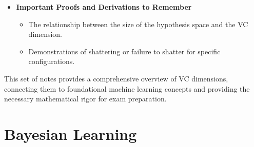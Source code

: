 \documentclass[
  12pt,
]{report}
\providecommand{\tightlist}{%
  \setlength{\itemsep}{0pt}\setlength{\parskip}{0pt}}
\begin{document}
\begin{enumerate}
\begin{itemize}
    \begin{itemize}
    \tightlist
    \item
      Understand the sample complexity equation and its components in terms of \(\epsilon\), \(\delta\), and VC dimension.
    \end{itemize}
  \item
    \textbf{Important Proofs and Derivations to Remember}

    \begin{itemize}
    \tightlist
    \item
      The relationship between the size of the hypothesis space and the VC dimension.
    \item
      Demonstrations of shattering or failure to shatter for specific configurations.
    \end{itemize}
  \end{itemize}
\end{enumerate}

This set of notes provides a comprehensive overview of VC dimensions, connecting them to foundational machine learning concepts and providing the necessary mathematical rigor for exam preparation.

\chapter{Bayesian Learning}
\end{document}
